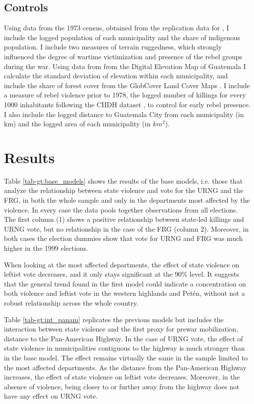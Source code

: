 \documentclass[12pt, notitlepage]{article}
\begin{document}
\subsection*{Controls}

Using data from the 1973 census, obtained from the replication data for \citet{Sullivan:2012aa}, I include the logged population of each municipality and the share of indigenous population.
I include two measures of terrain ruggedness, which strongly influenced the degree of wartime victimization and presence of the rebel groups during the war.
Using data from from the Digital Elevation Map of Guatemala \citep{Mapzen:2018aa} I calculate the standard deviation of elevation within each municipality, and include the share of forest cover from the GlobCover Land Cover Maps \citep{Arino:2012aa}.
I include a measure of rebel violence prior to 1978, the logged number of killings for every 1000 inhabitants following the CIIDH dataset \citep{Ball:1999aa}, to control for early rebel presence.
I also include the logged distance to Guatemala City from each municipality (in km) and the logged area of each municipality (in $km^2$).

\section*{Results}

Table \ref{tab-gt:base_models} shows the results of the base models, i.e. those that analyze the relationship between state violence and vote for the URNG and the FRG, in both the whole sample and only in the departments most affected by the violence.
In every case the data pools together observations from all elections.
The first column (1) shows a positive relationship between state-led killings and URNG vote, but no relationship in the case of the FRG (column 2).
Moreover, in both cases the election dummies show that vote for URNG and FRG was much higher in the 1999 elections.



When looking at the most affected departments, the effect of state violence on leftist vote decreases, and it only stays significant at the 90\% level.
It suggests that the general trend found in the first model could indicate a concentration on both violence and leftist vote in the western highlands and Petén, without not a robust relationship across the whole country.

Table \ref{tab-gt:int_panam} replicates the previous models but includes the interaction between state violence and the first proxy for prewar mobilization, distance to the Pan-American Highway.
In the case of URNG vote, the effect of state violence in municipalities contiguous to the highway is much stronger than in the base model.
The effect remains virtually the same in the sample limited to the most affected departments.
As the distance from the Pan-American Highway increases, the effect of state violence on leftist vote decreases.
Moreover, in the absence of violence, being closer to or further away from the highway does not have any effect on URNG vote.
\end{document}
